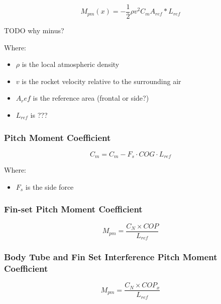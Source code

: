\documentclass[]{article}
\providecommand{\tightlist}{%
  \setlength{\itemsep}{0pt}\setlength{\parskip}{0pt}}
\begin{document}
\begin{equation}
\label{eq_pitching_moment}
M_{pm}(x) = - \dfrac{1}{2} \rho v^2 C_m A_{ref} * L_{ref}
\end{equation}

TODO why minus?

Where:

\begin{itemize}
\tightlist
\item
  \(\rho\) is the local atmospheric density
\item
  \(v\) is the rocket velocity relative to the surrounding air
\item
  \(A_ref\) is the reference area (frontal or side?)
\item
  \(L_{ref}\) is ???
\end{itemize}

\subsubsection{Pitch Moment Coefficient}\label{pitch-moment-coefficient}

\begin{equation}
\label{eq_pitch_moment}
C_m = C_m - F_s \cdot COG \cdot L_{ref} 
\end{equation}

Where:

\begin{itemize}
\tightlist
\item
  \(F_s\) is the side force
\end{itemize}

\subsubsection{Fin-set Pitch Moment
Coefficient}\label{fin-set-pitch-moment-coefficient}

\begin{equation}
M_{pm} = \dfrac{C_N \times COP}{L_{ref}}
\end{equation}

\subsubsection{Body Tube and Fin Set Interference Pitch Moment
Coefficient}\label{body-tube-and-fin-set-interference-pitch-moment-coefficient}

\begin{equation}
M_{pm} = \dfrac{C_N \times COP_x}{L_{ref}}
\end{equation}
\end{document}
